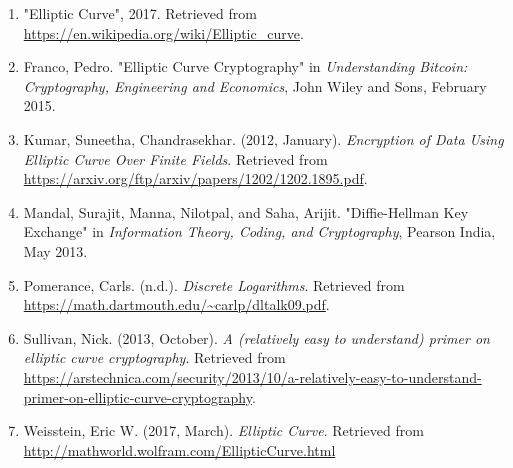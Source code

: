 \begin{enumerate}[(1)]
\item\label{wikipedia2017}
"Elliptic Curve", 2017. Retrieved from \url {https://en.wikipedia.org/wiki/Elliptic_curve}.

\item\label{Franco}
Franco, Pedro. "Elliptic Curve Cryptography" in \emph{Understanding Bitcoin: Cryptography, Engineering and Economics}, John Wiley and Sons, February 2015.

\item \label{Kumar}
Kumar, Suneetha, Chandrasekhar. (2012, January). \emph{Encryption of Data  Using
Elliptic Curve Over Finite Fields}. Retrieved from \newline 
\url{https://arxiv.org/ftp/arxiv/papers/1202/1202.1895.pdf}.

\item \label{Mandal}
Mandal, Surajit, Manna, Nilotpal, and Saha, Arijit. "Diffie-Hellman \newline
Key Exchange" in \emph{Information Theory, Coding, and Cryptography}, Pearson India, May 2013.

\item \label{Pomerance}
Pomerance, Carls. (n.d.). \emph{Discrete Logarithms}. Retrieved from \url{https://math.dartmouth.edu/~carlp/dltalk09.pdf}.

\item\label{Sullivan}
Sullivan, Nick. (2013, October). \emph{A (relatively easy to understand) primer on elliptic curve cryptography}. Retrieved from \url{https://arstechnica.com/security/2013/10/a-relatively-easy-to-understand-primer-on}\newline\url{-elliptic-curve-cryptography}.

\item \label{Wolframalpha}
Weisstein, Eric W. (2017, March). \emph{Elliptic Curve}. Retrieved from \url{http://mathworld.wolfram.com/EllipticCurve.html}

\end{enumerate}